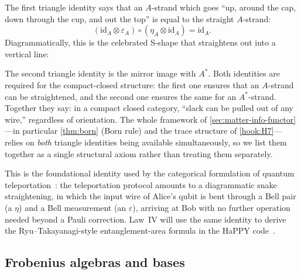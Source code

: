 \documentclass[12pt]{article}
\theoremstyle{definition}
\theoremstyle{remark}
\newcommand{\id}{\mathrm{id}}
\begin{document}
The first triangle identity says that an $A$-strand which goes ``up, around the cap, down through the cup, and out the top'' is equal to the straight $A$-strand:
\[
(\id_A \otimes \varepsilon_A) \circ (\eta_A \otimes \id_A) = \id_A.
\]
Diagrammatically, this is the celebrated S-shape that straightens out into a vertical line:
\begin{center}
\end{center}
The second triangle identity is the mirror image with $A^*$. Both identities are required for the compact-closed structure: the first one ensures that an $A$-strand can be straightened, and the second one ensures the same for an $A^*$-strand. Together they say: in a compact closed category, ``slack can be pulled out of any wire,'' regardless of orientation. The whole framework of \cref{sec:matter-info-functor}---in particular \cref{thm:born} (Born rule) and the trace structure of \cref{hook:H7}---relies on \emph{both} triangle identities being available simultaneously, so we list them together as a single structural axiom rather than treating them separately.

This is the foundational identity used by the categorical formulation of quantum teleportation~\cite{abramskycoecke2004}: the teleportation protocol amounts to a diagrammatic snake straightening, in which the input wire of Alice's qubit is bent through a Bell pair (a $\eta$) and a Bell measurement (an $\varepsilon$), arriving at Bob with no further operation needed beyond a Pauli correction. Law~IV will use the same identity to derive the Ryu--Takayanagi-style entanglement-area formula in the HaPPY code~\cite{pastawski2015}.

\subsection{Frobenius algebras and bases}
\end{document}
